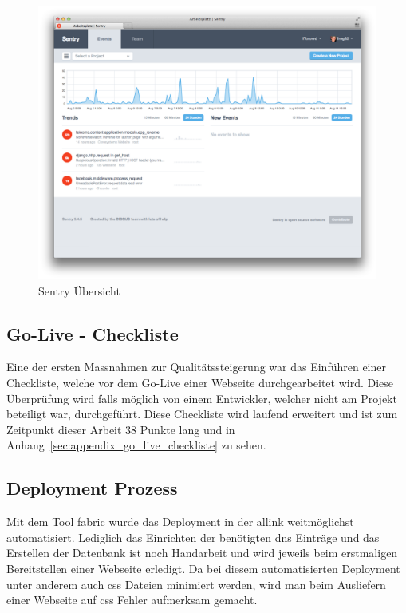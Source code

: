 \begin{figure}[h]
\centering
\includegraphics[width=1\textwidth]{images/sentry.png}
\caption{Sentry Übersicht}
\label{fig:sentry_index}
\end{figure}

\subsection{Go-Live - Checkliste}
\label{sub:go_live_checkliste}
Eine der ersten Massnahmen zur Qualitätssteigerung war das Einführen einer Checkliste, welche vor dem Go-Live einer Webseite durchgearbeitet wird. Diese Überprüfung wird falls möglich von einem Entwickler, welcher nicht am Projekt beteiligt war, durchgeführt. Diese Checkliste wird laufend erweitert und ist zum Zeitpunkt dieser Arbeit 38 Punkte lang und in Anhang~\ref{sec:appendix_go_live_checkliste} zu sehen.

\subsection{Deployment Prozess}
\label{sub:deployment_prozess}
Mit dem Tool fabric wurde das Deployment in der allink weitmöglichst automatisiert. Lediglich das Einrichten der benötigten \acrshort{dns} Einträge und das Erstellen der Datenbank ist noch Handarbeit und wird jeweils beim erstmaligen Bereitstellen einer Webseite erledigt. Da bei diesem automatisierten Deployment unter anderem auch \acrshort{css} Dateien minimiert werden, wird man beim Ausliefern einer Webseite auf \acrshort{css} Fehler aufmerksam gemacht.